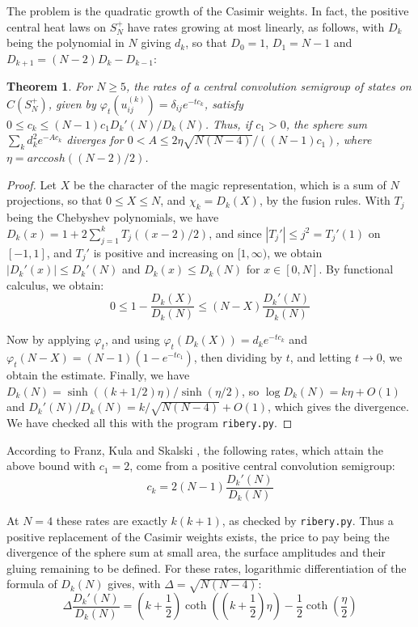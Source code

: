\documentclass[11pt]{amsart}
\newtheorem{theorem}{Theorem}[section]
\theoremstyle{definition}
\begin{document}
The problem is the quadratic growth of the Casimir weights. In fact, the positive central heat laws on $S_N^+$ have rates growing at most linearly, as follows, with $D_k$ being the polynomial in $N$ giving $d_k$, so that $D_0=1$, $D_1=N-1$ and $D_{k+1}=(N-2)D_k-D_{k-1}$:

\begin{theorem}
For $N\geq5$, the rates of a central convolution semigroup of states on $C(S_N^+)$, given by $\varphi_t(u^{(k)}_{ij})=\delta_{ij}e^{-tc_k}$, satisfy $0\leq c_k\leq(N-1)c_1D_k'(N)/D_k(N)$. Thus, if $c_1>0$, the sphere sum $\sum_kd_k^2e^{-Ac_k}$ diverges for $0<A\leq2\eta\sqrt{N(N-4)}/((N-1)c_1)$, where $\eta=arccosh((N-2)/2)$.
\end{theorem}

\begin{proof}
Let $X$ be the character of the magic representation, which is a sum of $N$ projections, so that $0\leq X\leq N$, and $\chi_k=D_k(X)$, by the fusion rules. With $T_j$ being the Chebyshev polynomials, we have $D_k(x)=1+2\sum_{j=1}^kT_j((x-2)/2)$, and since $|T_j'|\leq j^2=T_j'(1)$ on $[-1,1]$, and $T_j'$ is positive and increasing on $[1,\infty)$, we obtain $|D_k'(x)|\leq D_k'(N)$ and $D_k(x)\leq D_k(N)$ for $x\in[0,N]$. By functional calculus, we obtain:
$$0\leq1-\frac{D_k(X)}{D_k(N)}\leq(N-X)\frac{D_k'(N)}{D_k(N)}$$

Now by applying $\varphi_t$, and using $\varphi_t(D_k(X))=d_ke^{-tc_k}$ and $\varphi_t(N-X)=(N-1)(1-e^{-tc_1})$, then dividing by $t$, and letting $t\to0$, we obtain the estimate. Finally, we have $D_k(N)=\sinh((k+1/2)\eta)/\sinh(\eta/2)$, so $\log D_k(N)=k\eta+O(1)$ and $D_k'(N)/D_k(N)=k/\sqrt{N(N-4)}+O(1)$, which gives the divergence. We have checked all this with the program {\tt ribery.py}.
\end{proof}

According to Franz, Kula and Skalski \cite[Theorem 10.10]{fks}, the following rates, which attain the above bound with $c_1=2$, come from a positive central convolution semigroup:
$$c_k=2(N-1)\frac{D_k'(N)}{D_k(N)}$$

At $N=4$ these rates are exactly $k(k+1)$, as checked by {\tt ribery.py}. Thus a positive replacement of the Casimir weights exists, the price to pay being the divergence of the sphere sum at small area, the surface amplitudes and their gluing remaining to be defined. For these rates, logarithmic differentiation of the formula of $D_k(N)$ gives, with $\Delta=\sqrt{N(N-4)}$:
$$\Delta\frac{D_k'(N)}{D_k(N)}=\left(k+\frac{1}{2}\right)\coth\left(\left(k+\frac{1}{2}\right)\eta\right)-\frac{1}{2}\coth\left(\frac{\eta}{2}\right)$$
\end{document}
